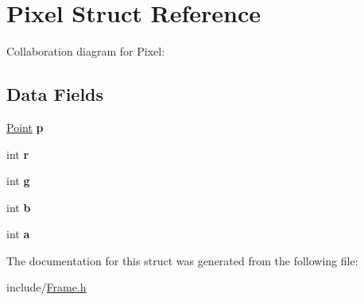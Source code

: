 \hypertarget{struct_pixel}{\section{Pixel Struct Reference}
\label{struct_pixel}
}


Collaboration diagram for Pixel\+:
\subsection*{Data Fields}
\begin{DoxyCompactItemize}
\item 
\hypertarget{struct_pixel_ae273773add45375b65c8555736acb60f}{\hyperlink{struct_vecteur}{Point} {\bfseries p}}\label{struct_pixel_ae273773add45375b65c8555736acb60f}

\item 
\hypertarget{struct_pixel_acab531abaa74a7e664e3986f2522b33a}{int {\bfseries r}}\label{struct_pixel_acab531abaa74a7e664e3986f2522b33a}

\item 
\hypertarget{struct_pixel_a71867e609034d4dbd6d0ad8d84540e59}{int {\bfseries g}}\label{struct_pixel_a71867e609034d4dbd6d0ad8d84540e59}

\item 
\hypertarget{struct_pixel_a148e3876077787926724625411d6e7a9}{int {\bfseries b}}\label{struct_pixel_a148e3876077787926724625411d6e7a9}

\item 
\hypertarget{struct_pixel_aa4c2a5552e9bc49b1816ff532f558c74}{int {\bfseries a}}\label{struct_pixel_aa4c2a5552e9bc49b1816ff532f558c74}

\end{DoxyCompactItemize}


The documentation for this struct was generated from the following file\+:\begin{DoxyCompactItemize}
\item 
include/\hyperlink{_frame_8h}{Frame.\+h}\end{DoxyCompactItemize}
